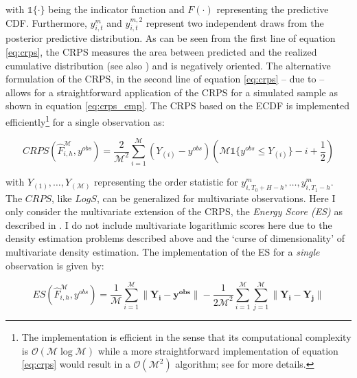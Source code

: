 \documentclass[12pt,letterpaper,fleqn]{article}           %
\begin{document}
with $\mathds{1}\{\cdot\}$ being the indicator function and $F(\cdot)$ representing the predictive CDF. Furthermore, $y_{i,t}^m$ and $y_{i,t}^{m,2}$ represent two independent draws from the posterior predictive distribution. As can be seen from the first line of equation \eqref{eq:crps}, the CRPS measures the area between predicted and the realized cumulative distribution (see also \cite{rav14}) and is negatively oriented. The alternative formulation of the CRPS, in the second line of equation \eqref{eq:crps} -- due to \textcite{gneiting07} -- allows for a straightforward application of the CRPS for a simulated sample as shown in equation \eqref{eq:crps_emp}.  %
The CRPS based on the ECDF is implemented efficiently\footnote{The implementation is efficient in the sense that its computational complexity is $\mathcal{O}(\mathcal{M}\log{}\mathcal{M})$ while a more straightforward implementation of equation \eqref{eq:crps} would result in a $\mathcal{O}(\mathcal{M}^2)$ algorithm; see \textcite{krueger19} for more details.} for a single observation as:

\begin{equation}
CRPS(\hat{F}^{\mathcal{M}}_{i,h},  y^{obs}) =  \frac{2}{\mathcal{M}^2} \sum_{i=1}^{\mathcal{M}} \left( Y_{(i)} - y^{obs} \right)
\left(\mathcal{M} \mathds{1}\{y^{obs} \leq Y_{(i)} \} - i + \frac{1}{2} \right)
\label{eq:crps_emp}
\end{equation}

with $Y_{(1)},\ldots,Y_{(\mathcal{M})}$ representing the order statistic for $y_{i,T_0+H-h}^{m},\ldots,y_{i,T_1-h}^{m}$. The $CRPS$, like $LogS$, can be generalized for multivariate observations. Here I only consider the multivariate extension of the CRPS, the \textit{Energy Score (ES)} as described in \textcite{gneiting08}. I do not include multivariate logarithmic scores here due to the density estimation problems described above and the `curse of dimensionality' of multivariate density estimation. The implementation of the ES for a \textit{single} observation is given by:

\begin{equation}
ES(\hat{F}^{\mathcal{M}}_{i,h},  y^{obs}) = \frac{1}{\mathcal{M}} \sum_{i=1}^{\mathcal{M}} \| \mathbf{Y_i} - \mathbf{y^{obs}} \| - \frac{1}{2\mathcal{M}^2} \sum_{i=1}^{\mathcal{M}} \sum_{j=1}^{\mathcal{M}}  \| \mathbf{Y_i} - \mathbf{Y_j} \|
\end{equation}
\end{document}
